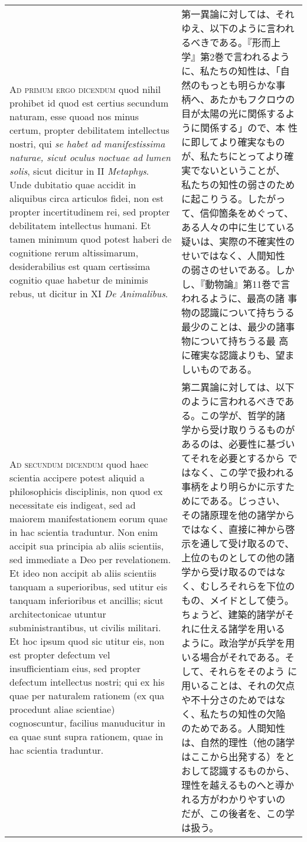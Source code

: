 \documentclass[10pt]{jsarticle}
\begin{document}
\begin{longtable}{p{21em}p{21em}}
\\


{\scshape Ad primum ergo dicendum} quod nihil prohibet id quod est
certius secundum naturam, esse quoad nos minus certum, propter
debilitatem intellectus nostri, qui {\itshape se habet ad
manifestissima naturae, sicut oculus noctuae ad lumen solis}, sicut
dicitur in II {\itshape Metaphys}. Unde dubitatio quae accidit in
aliquibus circa articulos fidei, non est propter incertitudinem rei,
sed propter debilitatem intellectus humani. Et tamen minimum quod
potest haberi de cognitione rerum altissimarum, desiderabilius est
quam certissima cognitio quae habetur de minimis rebus, ut dicitur in
XI {\itshape De Animalibus}.


&


第一異論に対しては、それゆえ、以下のように言われるべきである。『形而上
学』第2巻で言われるように、私たちの知性は、「自然のもっとも明らかな事
柄へ、あたかもフクロウの目が太陽の光に関係するように関係する」ので、本
性に即してより確実なものが、私たちにとってより確実でないということが、
私たちの知性の弱さのために起こりうる。したがって、信仰箇条をめぐって、
ある人々の中に生じている疑いは、実際の不確実性のせいではなく、人間知性
の弱さのせいである。しかし、『動物論』第11巻で言われるように、最高の諸
事物の認識について持ちうる最少のことは、最少の諸事物について持ちうる最
高に確実な認識よりも、望ましいものである。


\\


{\scshape Ad secundum dicendum} quod haec scientia accipere potest
aliquid a philosophicis disciplinis, non quod ex necessitate eis
indigeat, sed ad maiorem manifestationem eorum quae in hac scientia
traduntur. Non enim accipit sua principia ab aliis scientiis, sed
immediate a Deo per revelationem. Et ideo non accipit ab aliis
scientiis tanquam a superioribus, sed utitur eis tanquam inferioribus
et ancillis; sicut architectonicae utuntur subministrantibus, ut
civilis militari. Et hoc ipsum quod sic utitur eis, non est propter
defectum vel insufficientiam eius, sed propter defectum intellectus
nostri; qui ex his quae per naturalem rationem (ex qua procedunt aliae
scientiae) cognoscuntur, facilius manuducitur in ea quae sunt supra
rationem, quae in hac scientia traduntur.


&


第二異論に対しては、以下のように言われるべきである。この学が、哲学的諸
学から受け取りうるものがあるのは、必要性に基づいてそれを必要とするから
ではなく、この学で扱われる事柄をより明らかに示すためにである。じっさい、
その諸原理を他の諸学からではなく、直接に神から啓示を通して受け取るので、
上位のものとしての他の諸学から受け取るのではなく、むしろそれらを下位の
もの、メイドとして使う。ちょうど、建築的諸学がそれに仕える諸学を用いる
ように。政治学が兵学を用いる場合がそれである。そして、それらをそのよう
に用いることは、それの欠点や不十分さのためではなく、私たちの知性の欠陥
のためである。人間知性は、自然的理性（他の諸学はここから出発する）をと
おして認識するものから、理性を越えるものへと導かれる方がわかりやすいの
だが、この後者を、この学は扱う。

\end{longtable}
\newpage
\end{document}
